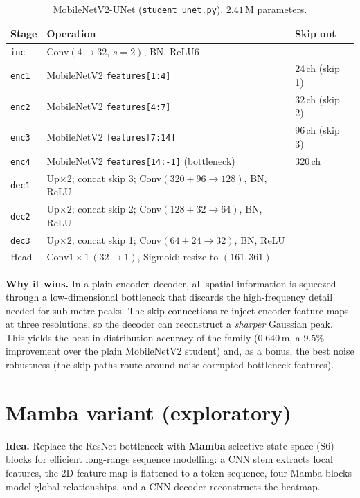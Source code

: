 \documentclass[11pt,a4paper]{article}
\newcommand{\code}[1]{\texttt{\small #1}}
\begin{document}
\begin{table}[h]
\centering
\caption{MobileNetV2-UNet (\code{student\_unet.py}), $2.41$\,M parameters.}
\begin{tabular}{@{}lll@{}}
\toprule
Stage & Operation & Skip out \\
\midrule
\code{inc}   & Conv$(4\!\to\!32,\,s{=}2)$, BN, ReLU6                              & --- \\
\code{enc1}  & MobileNetV2 \code{features[1:4]}                                   & 24\,ch (skip 1) \\
\code{enc2}  & MobileNetV2 \code{features[4:7]}                                   & 32\,ch (skip 2) \\
\code{enc3}  & MobileNetV2 \code{features[7:14]}                                  & 96\,ch (skip 3) \\
\code{enc4}  & MobileNetV2 \code{features[14:-1]} (bottleneck)                    & 320\,ch \\
\code{dec1}  & Up$\times2$; concat skip 3; Conv$(320{+}96\!\to\!128)$, BN, ReLU   & \\
\code{dec2}  & Up$\times2$; concat skip 2; Conv$(128{+}32\!\to\!64)$, BN, ReLU    & \\
\code{dec3}  & Up$\times2$; concat skip 1; Conv$(64{+}24\!\to\!32)$, BN, ReLU     & \\
Head         & Conv$1\times1\,(32\!\to\!1)$, Sigmoid; resize to $(161,361)$       & \\
\bottomrule
\end{tabular}
\end{table}

\textbf{Why it wins.} In a plain encoder--decoder, all spatial information is squeezed through a
low-dimensional bottleneck that discards the high-frequency detail needed for sub-metre peaks.
The skip connections re-inject encoder feature maps at three resolutions, so the decoder can
reconstruct a \emph{sharper} Gaussian peak. This yields the best in-distribution accuracy of the
family ($0.640$\,m, a $9.5\%$ improvement over the plain MobileNetV2 student) and, as a bonus,
the best noise robustness (the skip paths route around noise-corrupted bottleneck features).

\section{Mamba variant (exploratory)}

\textbf{Idea.} Replace the ResNet bottleneck with \textbf{Mamba} selective state-space (S6) blocks
for efficient long-range sequence modelling: a CNN stem extracts local features, the 2D feature
map is flattened to a token sequence, four Mamba blocks model global relationships, and a CNN
decoder reconstructs the heatmap.
\end{document}

